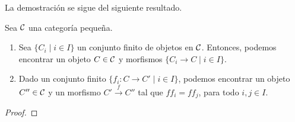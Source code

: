 La demostración se sigue del siguiente resultado. 
\begin{prop} Sea ${\mathcal C}$ una categoría pequeña.
    \begin{enumerate}
        \item Sea $\{C_i\mid i\in I\}$ un conjunto finito de objetos en ${\mathcal C}$. Entonces, podemos encontrar un objeto $C\in{\mathcal C}$ y morfismos $\{C_i\to C\mid i\in I\}$. 
        \item  Dado un conjunto finito $\{f_i:C\to C'\mid i\in I\}$, podemos encontrar un objeto $C''\in {\mathcal C}$ y un morfismo $C'\xrightarrow{f} C''$ tal que $ff_i=ff_j$, para todo $i,j\in I$. 
    \end{enumerate}
\end{prop}
\begin{proof}
    
\end{proof}
